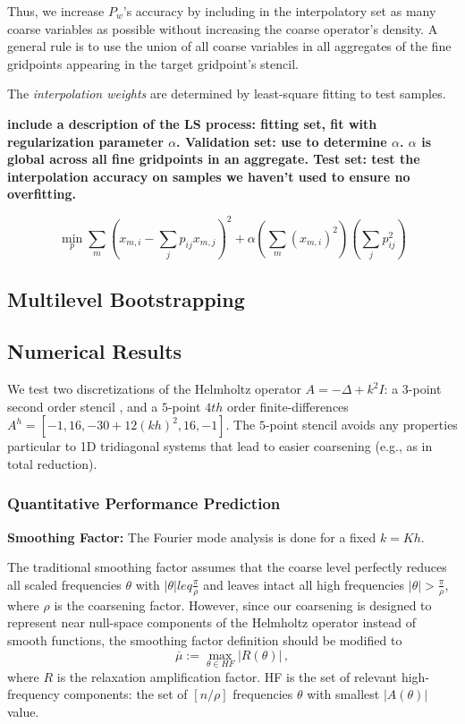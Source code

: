 \documentclass{article}
\begin{document}
Thus, we increase $P_w$'s accuracy by including in the interpolatory set as many coarse variables as possible without increasing the coarse operator's density. A general rule is to use the union of all coarse variables in all aggregates of the fine gridpoints appearing in the target gridpoint's stencil.

The \emph{interpolation weights} are determined by least-square fitting to test samples.

{\bf include a description of the LS process: fitting set, fit with regularization parameter $\alpha$. Validation set: use to determine $\alpha$. $\alpha$ is global across all fine gridpoints in an aggregate. Test set: test the interpolation accuracy on samples we haven't used to ensure no overfitting.
}

\begin{equation}
	\min_p \sum_m \left( x_{m,i} - \sum_j p_{ij} x_{m,j} \right)^2 + \alpha \left( \sum_m (x_{m,i})^2 \right) \left(\sum_j p_{ij}^2\right) 
\end{equation}

\subsection{Multilevel Bootstrapping}

\subsection{Numerical Results}
We test two discretizations of the Helmholtz operator $A = -\Delta + k^2 I$: a $3$-point second order stencil , and a $5$-point $4th$ order finite-differences $A^h = [-1, 16, -30 + 12 (kh)^2, 16, -1]$. The $5$-point stencil avoids any properties particular to 1D tridiagonal systems that lead to easier coarsening (e.g., as in total reduction).

\subsubsection{Quantitative Performance Prediction}

{\bf Smoothing Factor:} The Fourier mode analysis is done for a fixed $k = K h$.

The traditional smoothing factor \cite[Sec. ??]{guide} assumes that the coarse level perfectly reduces all scaled frequencies $\theta$ with $|\theta| leq \frac{\pi}{\rho}$ and leaves intact all high frequencies $|\theta| > \frac{\pi}{\rho}$, where $\rho$ is the coarsening factor. However, since our coarsening is designed to represent near null-space components of the Helmholtz operator instead of smooth functions, the smoothing factor definition should be modified to
\begin{equation}
	\overline{\mu} := \max_{\theta \in HF} \left| R(\theta) \right|\,,
\end{equation}
where $R$ is the relaxation amplification factor. HF is the set of relevant high-frequency components: the set of $[n/\rho]$ frequencies $\theta$ with smallest $|A(\theta)|$ value.
\end{document}
